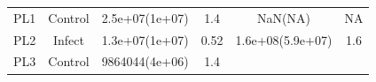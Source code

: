 \documentclass[]{article}
\begin{document}
\begin{longtable}[]{@{}cccccc@{}}
\begin{minipage}[t]{0.12\columnwidth}\centering\strut
PL1
\strut\end{minipage} &
\begin{minipage}[t]{0.12\columnwidth}\centering\strut
Control
\strut\end{minipage} &
\begin{minipage}[t]{0.16\columnwidth}\centering\strut
2.5e+07(1e+07)
\strut\end{minipage} &
\begin{minipage}[t]{0.16\columnwidth}\centering\strut
1.4
\strut\end{minipage} &
\begin{minipage}[t]{0.17\columnwidth}\centering\strut
NaN(NA)
\strut\end{minipage} &
\begin{minipage}[t]{0.12\columnwidth}\centering\strut
NA
\strut\end{minipage}\tabularnewline
\begin{minipage}[t]{0.12\columnwidth}\centering\strut
PL2
\strut\end{minipage} &
\begin{minipage}[t]{0.12\columnwidth}\centering\strut
Infect
\strut\end{minipage} &
\begin{minipage}[t]{0.16\columnwidth}\centering\strut
1.3e+07(1e+07)
\strut\end{minipage} &
\begin{minipage}[t]{0.16\columnwidth}\centering\strut
0.52
\strut\end{minipage} &
\begin{minipage}[t]{0.17\columnwidth}\centering\strut
1.6e+08(5.9e+07)
\strut\end{minipage} &
\begin{minipage}[t]{0.12\columnwidth}\centering\strut
1.6
\strut\end{minipage}\tabularnewline
\begin{minipage}[t]{0.12\columnwidth}\centering\strut
PL3
\strut\end{minipage} &
\begin{minipage}[t]{0.12\columnwidth}\centering\strut
Control
\strut\end{minipage} &
\begin{minipage}[t]{0.16\columnwidth}\centering\strut
9864044(4e+06)
\strut\end{minipage} &
\begin{minipage}[t]{0.16\columnwidth}\centering\strut
1.4

\end{minipage}
\end{longtable}
\end{document}
